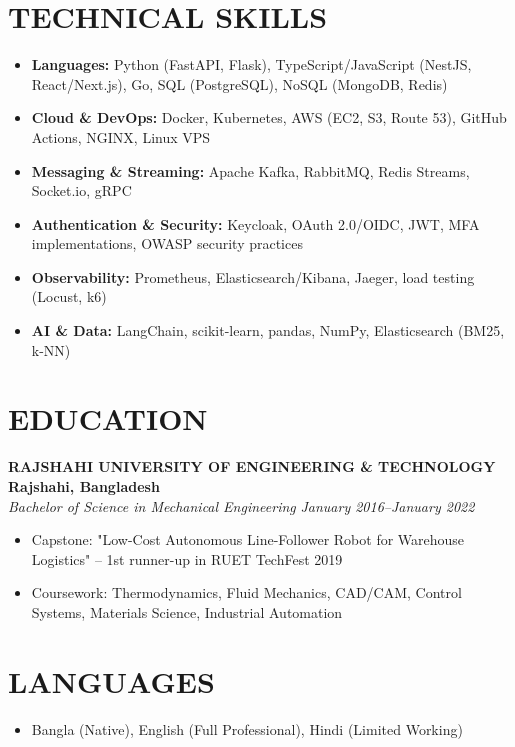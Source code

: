 \documentclass[11pt,letterpaper]{article}
\newcommand{\role}[4]{
  \begin{center}
  \textbf{#1} \hfill \textbf{#2} \\
  \textit{#3} \hfill \textit{#4}
  \end{center}
}
\begin{document}
\vspace{1em}
\section{TECHNICAL SKILLS}

\vspace{0.5em}
\begin{itemize}[leftmargin=*,nosep]
  \item \textbf{Languages:} Python (FastAPI, Flask), TypeScript/JavaScript (NestJS, React/Next.js), Go, SQL (PostgreSQL), NoSQL (MongoDB, Redis)
  \item \textbf{Cloud \& DevOps:} Docker, Kubernetes, AWS (EC2, S3, Route 53), GitHub Actions, NGINX, Linux VPS
  \item \textbf{Messaging \& Streaming:} Apache Kafka, RabbitMQ, Redis Streams, Socket.io, gRPC
  \item \textbf{Authentication \& Security:} Keycloak, OAuth 2.0/OIDC, JWT, MFA implementations, OWASP security practices
  \item \textbf{Observability:} Prometheus, Elasticsearch/Kibana, Jaeger, load testing (Locust, k6)
  \item \textbf{AI \& Data:} LangChain, scikit-learn, pandas, NumPy, Elasticsearch (BM25, k-NN)
\end{itemize}

\vspace{1em}
\section{EDUCATION}

\vspace{0.5em}
\role{RAJSHAHI UNIVERSITY OF ENGINEERING \& TECHNOLOGY}{Rajshahi, Bangladesh}{Bachelor of Science in Mechanical Engineering}{January 2016--January 2022}
\begin{itemize}[leftmargin=*,nosep,topsep=0pt]
  \item Capstone: "Low-Cost Autonomous Line-Follower Robot for Warehouse Logistics" -- 1st runner-up in RUET TechFest 2019
  \item Coursework: Thermodynamics, Fluid Mechanics, CAD/CAM, Control Systems, Materials Science, Industrial Automation
\end{itemize}

\vspace{1em}
\section{LANGUAGES}

\vspace{0.5em}
\begin{itemize}[leftmargin=*,nosep]
  \item Bangla (Native), English (Full Professional), Hindi (Limited Working)
\end{itemize}
\end{document}
